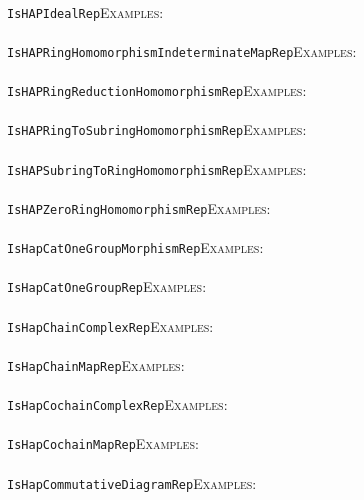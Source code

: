 \documentclass[a4paper,11pt]{report}
\begin{document}
{{ \\
 \texttt{IsHAPIdealRep}{\nobreakspace}{\nobreakspace}{\nobreakspace}{\nobreakspace}\textsc{Examples:} \\
 \\
 \texttt{IsHAPRingHomomorphismIndeterminateMapRep}{\nobreakspace}{\nobreakspace}{\nobreakspace}{\nobreakspace}\textsc{Examples:} \\
 \\
 \texttt{IsHAPRingReductionHomomorphismRep}{\nobreakspace}{\nobreakspace}{\nobreakspace}{\nobreakspace}\textsc{Examples:} \\
 \\
 \texttt{IsHAPRingToSubringHomomorphismRep}{\nobreakspace}{\nobreakspace}{\nobreakspace}{\nobreakspace}\textsc{Examples:} \\
 \\
 \texttt{IsHAPSubringToRingHomomorphismRep}{\nobreakspace}{\nobreakspace}{\nobreakspace}{\nobreakspace}\textsc{Examples:} \\
 \\
 \texttt{IsHAPZeroRingHomomorphismRep}{\nobreakspace}{\nobreakspace}{\nobreakspace}{\nobreakspace}\textsc{Examples:} \\
 \\
 \texttt{IsHapCatOneGroupMorphismRep}{\nobreakspace}{\nobreakspace}{\nobreakspace}{\nobreakspace}\textsc{Examples:} \\
 \\
 \texttt{IsHapCatOneGroupRep}{\nobreakspace}{\nobreakspace}{\nobreakspace}{\nobreakspace}\textsc{Examples:} \\
 \\
 \texttt{IsHapChainComplexRep}{\nobreakspace}{\nobreakspace}{\nobreakspace}{\nobreakspace}\textsc{Examples:} \\
 \\
 \texttt{IsHapChainMapRep}{\nobreakspace}{\nobreakspace}{\nobreakspace}{\nobreakspace}\textsc{Examples:} \\
 \\
 \texttt{IsHapCochainComplexRep}{\nobreakspace}{\nobreakspace}{\nobreakspace}{\nobreakspace}\textsc{Examples:} \\
 \\
 \texttt{IsHapCochainMapRep}{\nobreakspace}{\nobreakspace}{\nobreakspace}{\nobreakspace}\textsc{Examples:} \\
 \\
 \texttt{IsHapCommutativeDiagramRep}{\nobreakspace}{\nobreakspace}{\nobreakspace}{\nobreakspace}\textsc{Examples:} \\
}}
\end{document}
